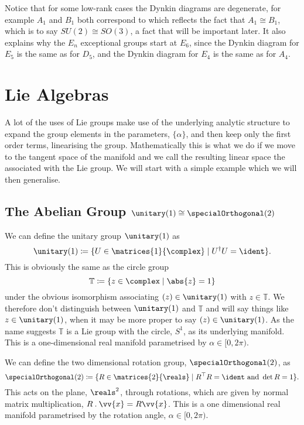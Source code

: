 Notice that for some low-rank cases the Dynkin diagrams are degenerate, for example \(A_1\) and \(B_1\) both correspond to
which reflects the fact that \(A_1 \cong B_1\), which is to say \(SU(2) \cong SO(3)\), a fact that will be important later.
It also explains why the \(E_n\) exceptional groups start at \(E_6\), since the Dynkin diagram for \(E_5\) is the same as for \(D_5\), and the Dynkin diagram for \(E_4\) is the same as for \(A_4\).

\chapter{Lie Algebras}
A lot of the uses of Lie groups make use of the underlying analytic structure to expand the group elements in the parameters, \(\{\alpha\}\), and then keep only the first order terms, linearising the group.
Mathematically this is what we do if we move to the tangent space of the manifold and we call the resulting linear space the  associated with the Lie group.
We will start with a simple example which we will then generalise.

\section{The Abelian Group \texorpdfstring{\(\unitary(1) \isomorphic \specialOrthogonal(2)\)}{U(1) isomorphic to SO(2)}}
We can define the unitary group \(\unitary(1)\) as
\begin{equation}
    \unitary(1) \coloneqq \{ U \in \matrices{1}{\complex} \mid U^\hermit U = \ident \}.
\end{equation}
This is obviously the same as the circle group
\begin{equation}
    \mathbb{T} \coloneqq \{ z \in \complex \mid \abs{z} = 1 \}
\end{equation}
under the obvious isomorphism associating \((z) \in \unitary(1)\) with \(z \in \mathbb{T}\).
We therefore don't distinguish between \(\unitary(1)\) and \(\mathbb{T}\) and will say things like \(z \in \unitary(1)\), when it may be more proper to say \((z) \in \unitary(1)\).
As the name suggests \(\mathbb{T}\) is a Lie group with the circle, \(S^1\), as its underlying manifold.
This is a one-dimensional real manifold parametrised by \(\alpha \in [0, 2\pi)\).

We can define the two dimensional rotation group, \(\specialOrthogonal(2)\), as
\begin{equation}
    \specialOrthogonal(2) \coloneqq \{ R \in \matrices{2}{\reals} \mid R^\trans R = \ident \text{ and } \det R = 1 \}.
\end{equation}
This acts on the plane, \(\reals^2\), through rotations, which are given by normal matrix multiplication, \(R \action \vv{x} = R\vv{x}\).
This is a one dimensional real manifold parametrised by the rotation angle, \(\alpha \in [0, 2\pi)\).

